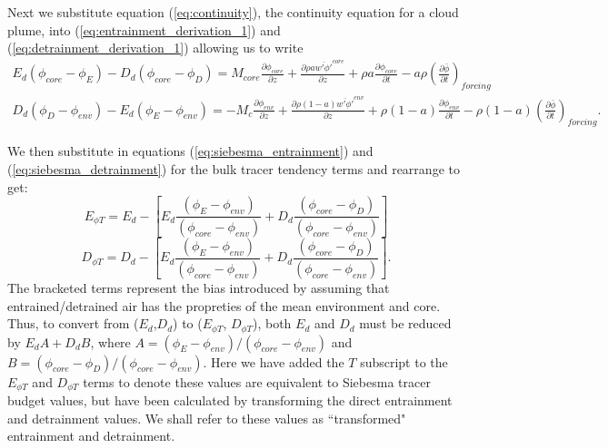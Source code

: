 \documentclass[12pt]{article}
\begin{document}
Next we substitute equation (\ref{eq:continuity}), the continuity equation 
for a cloud plume, into (\ref{eq:entrainment_derivation_1}) 
and (\ref{eq:detrainment_derivation_1}) allowing us to write
\begin{eqnarray}
  \label{eq:entrainment_derivation_2}
    E_d (\phi_{core} - \phi_E) - D_d (\phi_{core} - \phi_D)
    = M_{core} \frac{\partial \phi_{core}}{\partial z}
    + \frac{\partial \rho a \overline{w' \phi'}^{core}}{\partial z} 
    + \rho a \frac{\partial \phi_{core}}{\partial t}
    - a \rho \left(\frac{\partial \bar{\phi}}{\partial t}\right)_{forcing}
\end{eqnarray}
\begin{eqnarray}
  \label{eq:detrainment_derivation_2}
    D_d (\phi_D - \phi_{env}) - E_d (\phi_E - \phi_{env})
    = - M_c \frac{\partial \phi_{env}}{\partial z}
    + \frac{\partial \rho (1 - a) \overline{w' \phi'}^{env}}{\partial z} 
    + \rho (1 - a) \frac{\partial \phi_{env}}{\partial t}
    - \rho (1 - a) \left(\frac{\partial \bar{\phi}}{\partial t}\right)_{forcing}.
\end{eqnarray}

We then substitute in equations (\ref{eq:siebesma_entrainment}) and 
(\ref{eq:siebesma_detrainment}) for the bulk tracer tendency terms and 
rearrange to get:
\begin{equation}
  \label{eq:corrected_entrainment}
    E_{\phi T} = E_d 
             - \left[E_d\frac{(\phi_E - \phi_{env})}{(\phi_{core} - \phi_{env})}
                   + D_d\frac{(\phi_{core} - \phi_D)}{(\phi_{core} - \phi_{env})}\right]
\end{equation}
\begin{equation}
  \label{eq:corrected_detrainment}
    D_{\phi T} = D_d
             - \left[E_d\frac{(\phi_E - \phi_{env})}{(\phi_{core} - \phi_{env})}
                   + D_d\frac{(\phi_{core} - \phi_D)}{(\phi_{core} - \phi_{env})}\right].
\end{equation}
The bracketed terms represent the bias introduced by assuming that
entrained/detrained air has the propreties of the mean environment and
core.  Thus, to convert from ($E_d$,$D_d$) to ($E_{\phi T}$, $D_{\phi  T}$), 
both $E_d$ and $D_d$ must be reduced by $E_d A + D_d B$, where
$A = (\phi_E - \phi_{env})/(\phi_{core} - \phi_{env})$ and $B =
(\phi_{core} - \phi_D)/(\phi_{core} - \phi_{env})$.  Here we have
added the $T$ subscript to the $E_{\phi T}$ and $D_{\phi T}$ terms to
denote these values are equivalent to Siebesma tracer budget values,
but have been calculated by transforming the direct entrainment and
detrainment values.  We shall refer to these values as ``transformed"
entrainment and detrainment.
\end{document}

